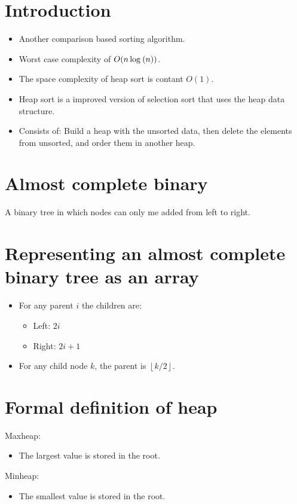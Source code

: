 \section{Introduction}
\begin{itemize}
    \item Another comparison based sorting algorithm.
    \item Worst case complexity of $O(n\log_{} \left( n \right)  )$. 
    \item The space complexity of heap sort is contant $O(1)$.
    \item Heap sort is a improved version of selection sort that uses the heap data structure.
    \item Consists of: Build a heap with the unsorted data, then delete the elements from unsorted, and order them in another heap.
\end{itemize}

\section{Almost complete binary}
A binary tree in which nodes can only me added from left to right. 


\section{Representing an almost complete binary tree as an array}
\begin{itemize}
    \item For any parent $i$ the children are: 
        \begin{itemize}
            \item Left: $2i$ 
            \item Right: $2i+1$ 
        \end{itemize}
    
    \item For any child node $k$, the parent is $\left\lfloor k/2 \right\rfloor$.
\end{itemize}

\section{Formal definition of heap}
Maxheap:
\begin{itemize}
    \item The largest value is stored in the root.
\end{itemize}
Minheap: 
\begin{itemize}
    \item The smallest value is stored in the root.
\end{itemize}
